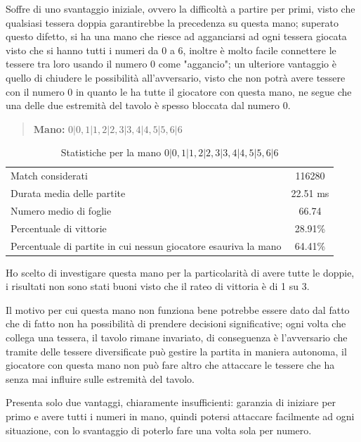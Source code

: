 \documentclass[a4paper,12pt]{report} %
\begin{document}
Soffre di uno svantaggio iniziale, ovvero la difficoltà a partire per primi, visto che qualsiasi tessera doppia garantirebbe la precedenza su questa mano; superato questo difetto,
si ha una mano che riesce ad agganciarsi ad ogni tessera giocata visto che si hanno tutti i numeri da 0 a 6, inoltre è molto facile connettere le tessere tra loro usando il numero 0 come "aggancio";
un ulteriore vantaggio è quello di chiudere le possibilità all'avversario, visto che non potrà avere tessere con il numero 0 in quanto le ha tutte il giocatore con questa mano, ne segue che una delle 
due estremità del tavolo è spesso bloccata dal numero 0. 


\begin{quote}
    \textbf{Mano:} \(0|0, 1|1, 2|2, 3|3, 4|4, 5|5, 6|6\)
\end{quote}

\begin{table}[h!]
    \centering
    \begin{tabular}{|l|c|}
        \hline
        Match considerati & 116280 \\
        Durata media delle partite & 22.51 ms \\
        Numero medio di foglie & 66.74 \\
        Percentuale di vittorie & 28.91\% \\
        Percentuale di partite in cui nessun giocatore esauriva la mano & 64.41\% \\
        \hline
    \end{tabular}
    \caption{Statistiche per la mano \(0|0, 1|1, 2|2, 3|3, 4|4, 5|5, 6|6\)}
    \label{tab:stats_1}
\end{table}

Ho scelto di investigare questa mano per la particolarità di avere tutte le doppie, i risultati non sono stati buoni visto che il rateo di vittoria è di 1 su 3.

Il motivo per cui questa mano non funziona bene potrebbe essere dato dal fatto che di fatto non ha possibilità di prendere decisioni significative; ogni volta che collega una tessera, il tavolo rimane invariato, di conseguenza è l'avversario che tramite delle tessere diversificate può gestire la partita in maniera autonoma, il giocatore con questa mano non può fare altro che attaccare le tessere che ha senza mai influire sulle estremità del tavolo.

Presenta solo due vantaggi, chiaramente insufficienti: garanzia di iniziare per primo e avere tutti i numeri in mano, quindi potersi attaccare facilmente ad ogni situazione, con lo svantaggio di poterlo fare una volta sola per numero.
\end{document}

